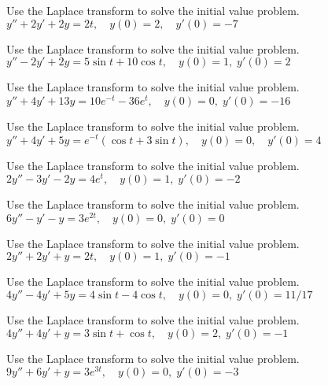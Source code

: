 \documentclass{ximera}
\begin{document}
\begin{problem}\label{exer:8.3.28} Use the Laplace transform to solve the initial value problem. $y''+2y'+2y=2t, \quad  y(0)=2,\quad y'(0)=-7$
\end{problem}

\begin{problem}\label{exer:8.3.29} Use the Laplace transform to solve the initial value problem. $y''-2y'+2y=5\sin t+10\cos t, \quad  y(0)=1,\;
y'(0)=2$
\end{problem}

\begin{problem}\label{exer:8.3.30} Use the Laplace transform to solve the initial value problem. $y''+4y'+13y=10e^{-t}-36e^t, \quad  y(0)=0,\;
y'(0)=-16$
\end{problem}

\begin{problem}\label{exer:8.3.31} Use the Laplace transform to solve the initial value problem. $y''+4y'+5y=e^{-t}(\cos t+3\sin t), \quad
y(0)=0,\quad y'(0)=4$
\end{problem}

\begin{problem}\label{exer:8.3.32} Use the Laplace transform to solve the initial value problem. $2y''-3y'-2y=4e^t, \quad   y(0)=1,\;  y'(0)=-2$
\end{problem}

\begin{problem}\label{exer:8.3.33} Use the Laplace transform to solve the initial value problem. $6y''-y'-y=3e^{2t}, \quad   y(0)=0,\;  y'(0)=0$
\end{problem}

\begin{problem}\label{exer:8.3.34} Use the Laplace transform to solve the initial value problem. $2y''+2y'+y=2t, \quad   y(0)=1,\;  y'(0)=-1$
\end{problem}

\begin{problem}\label{exer:8.3.35} Use the Laplace transform to solve the initial value problem. $4y''-4y'+5y=4\sin t-4\cos t, \quad   y(0)=0,\;  y'(0)=11/17$
\end{problem}

\begin{problem}\label{exer:8.3.36} Use the Laplace transform to solve the initial value problem. $4y''+4y'+y=3\sin t+\cos t, \quad   y(0)=2,\;  y'(0)=-1$
\end{problem}

\begin{problem}\label{exer:8.3.37} Use the Laplace transform to solve the initial value problem. $9y''+6y'+y=3e^{3t}, \quad   y(0)=0,\;  y'(0)=-3$
\end{problem}
\end{document}
